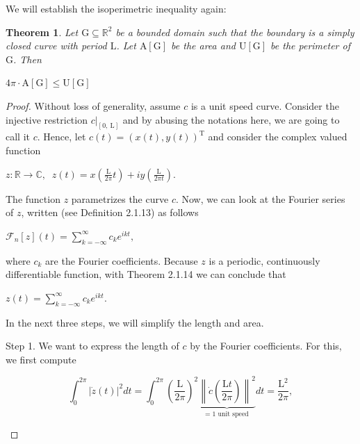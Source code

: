 \documentclass[a4paper]{book}
\newtheorem{theorem}{Theorem}%
\numberwithin{theorem}{section}%
\begin{document}
We will establish the isoperimetric inequality again:
\begin{theorem}
    Let $\mathrm{G}\subseteq\mathbb{R}^{2}$ be a bounded domain such that the boundary is a simply closed curve with period $\mathrm{L}$. Let $\mathrm{A}[\mathrm{G}]$ be the area and $\mathrm{U}[\mathrm{G}]$ be the perimeter of $\mathrm{G}$. Then
    \begin{center}
        $4\pi\cdot\mathrm{A}[\mathrm{G}]\leq\mathrm{U}[\mathrm{G}]$
    \end{center}
\end{theorem}
\begin{proof}
    Without loss of generality, assume $c$ is a unit speed curve. Consider the injective restriction $\displaystyle \left.c\right|_{[0, \mathrm{~L}]}$ and by abusing the notations here, we are going to call it $c$. Hence, let $c(t)=(x(t), y(t))^{\mathrm{T}}$ and consider the complex valued function
    \begin{center}
        $\displaystyle z:\mathbb{R} \rightarrow \mathbb{C},\;\; z(t)=x\left(\frac{\mathrm{L}}{2 \pi} t\right)+i y\left(\frac{\mathrm{L}}{2 \pi t}\right).$
    \end{center}

    The function $z$ parametrizes the curve $c$. Now, we can look at the Fourier series of $z$, written (see Definition 2.1.13) as follows
    \begin{center}
        $\displaystyle \mathscr{F}_n[z](t)=\sum_{k=-\infty}^{\infty}c_k e^{i k t},$
    \end{center}

    where $c_k$ are the Fourier coefficients. Because $z$ is a periodic, continuously differentiable function, with Theorem 2.1.14 we can conclude that
    \begin{center}
        $\displaystyle z(t)=\sum_{k=-\infty}^{\infty} c_k e^{i k t}.$
    \end{center}

    In the next three steps, we will simplify the length and area. 
    
    Step 1. We want to express the length of $c$ by the Fourier coefficients. For this, we first compute
    \begin{center}
        \begin{equation}
            \displaystyle \int_0^{2 \pi}|\dot{z}(t)|^2 d t=\int_0^{2 \pi}\left(\frac{\mathrm{L}}{2 \pi}\right)^2 \underbrace{\left\|\dot{c}\left(\frac{\mathrm{L} t}{2 \pi}\right)\right\|^2}_{=1 \text { unit speed }} d t=\frac{\mathrm{L}^2}{2 \pi},
        \end{equation}
    \end{center}


\end{proof}
\end{document}
